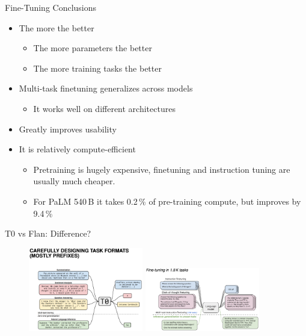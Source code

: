\begin{vbframe}{Fine-Tuning Conclusions}

\vfill

\begin{itemize}
\item The  more the better
    \begin{itemize}
    \item The more parameters the better
    \item The more training tasks the better
    \end{itemize}
\item Multi-task finetuning generalizes across models
    \begin{itemize}
    \item It works well on different architectures
    \end{itemize}
\item Greatly improves usability
\item It is relatively compute-efficient
    \begin{itemize}
    \item Pretraining is hugely expensive, finetuning and
    instruction tuning are usually much cheaper.
    \item For PaLM 540\,B it takes 0.2\,\% of pre-training compute, but improves by 9.4\,\%
    \end{itemize}
\end{itemize}

\vfill

\end{vbframe}



\begin{frame}{T0 vs Flan: Difference?}

\vfill
	
	\begin{figure}
		\includegraphics[width=5cm]{figure/t0comparison}
		\includegraphics[width=5cm]{figure/flancomparison}
	\end{figure}

\vfill

\end{frame}



